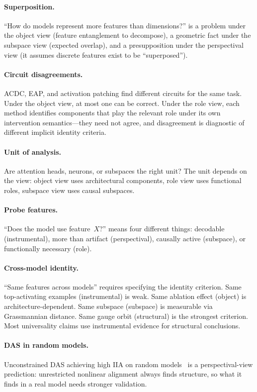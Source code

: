 \documentclass{article}
\begin{document}
\paragraph{Superposition.}
``How do models represent more features than dimensions?'' is a
problem under the object view (feature entanglement to decompose), a
geometric fact under the subspace view (expected overlap), and a
presupposition under the perspectival view (it assumes discrete
features exist to be ``superposed'').

\paragraph{Circuit disagreements.}
ACDC, EAP, and activation patching find different circuits for the same
task.  Under the object view, at most one can be correct.  Under the
role view, each method identifies components that play the relevant
role under its own intervention semantics---they need not agree, and
disagreement is diagnostic of different implicit identity criteria.

\paragraph{Unit of analysis.}
Are attention heads, neurons, or subspaces the right unit?  The unit
depends on the view: object view uses architectural components, role
view uses functional roles, subspace view uses causal subspaces.

\paragraph{Probe features.}
``Does the model use feature~$X$?'' means four different things:
decodable (instrumental), more than artifact (perspectival), causally
active (subspace), or functionally necessary (role).

\paragraph{Cross-model identity.}
``Same features across models'' requires specifying the identity
criterion.  Same top-activating examples (instrumental) is weak.
Same ablation effect (object) is architecture-dependent.  Same
subspace (subspace) is measurable via Grassmannian distance.  Same
gauge orbit (structural) is the strongest criterion.  Most
universality claims use instrumental evidence for structural
conclusions.

\paragraph{DAS in random models.}
Unconstrained DAS achieving high IIA on random
models~\citep{sutter2025} is a perspectival-view prediction:
unrestricted nonlinear alignment always finds structure, so
what it finds in a real model needs stronger validation.
\end{document}
